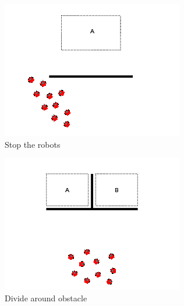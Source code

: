 \documentclass[]{article}
\begin{document}
\begin{figure}
\begin{subfigure}{0.42\textwidth}
		\includegraphics[width=\linewidth]{slide_images/Swarm_Robot_Control_-_10_Robot_0007.png}
		\caption{Stop the robots}
		\label{fig:sub1}
	\end{subfigure}%
	\begin{subfigure}{0.42\textwidth}
		\centering
		\includegraphics[width=\linewidth]{slide_images/Swarm_Robot_Control_-_10_Robot_0009.png}
		\caption{Divide around obstacle}
		\label{fig:sub2}
	\end{subfigure}
	\begin{subfigure}{0.42\textwidth}
		\centering

\end{subfigure}
\end{figure}
\end{document}

